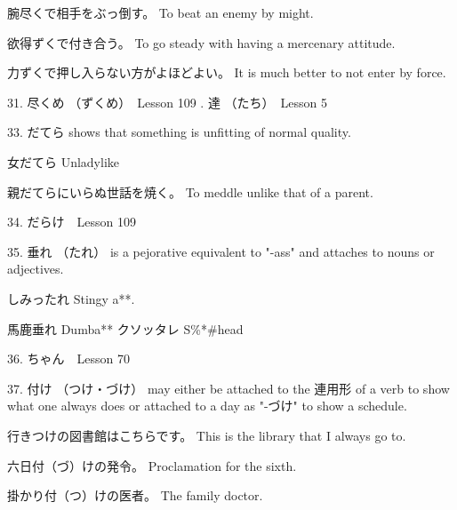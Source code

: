 \par{腕尽くで相手をぶっ倒す。 \hfill\break
To beat an enemy by might. }

\par{欲得ずくで付き合う。 \hfill\break
To go steady with having a mercenary attitude. }

\par{力ずくで押し入らない方がよほどよい。 \hfill\break
It is much better to not enter by force. }

\par{31. 尽くめ （ずくめ）　\textrightarrow  Lesson 109  \hfill{}. 達 （たち）　\textrightarrow  Lesson 5  }

\par{33. だてら shows that something is unfitting of normal quality. }

\par{女だてら \hfill\break
Unladylike }

\par{親だてらにいらぬ世話を焼く。 \hfill\break
To meddle unlike that of a parent. }

\par{34. だらけ　\textrightarrow  Lesson 109  }

\par{35. 垂れ （たれ） is a pejorative equivalent to "-ass" and attaches to nouns or adjectives. }

\par{しみったれ \hfill\break
Stingy a**. }

\par{馬鹿垂れ \hfill\break
Dumba** \hfill\break
\hfill\break
クソッタレ \hfill\break
S\%*\#head }

\par{36. ちゃん　\textrightarrow  Lesson 70  \hfill\break
}

\par{37. 付け （つけ・づけ） may either be attached to the 連用形 of a verb  to show what one always does or attached to a day as "-づけ" to show a schedule. }

\par{行きつけの図書館はこちらです。 \hfill\break
This is the library that I always go to. }

\par{六日付（づ）けの発令。 \hfill\break
Proclamation for the sixth. }

\par{掛かり付（つ）けの医者。 \hfill\break
The family doctor. }

